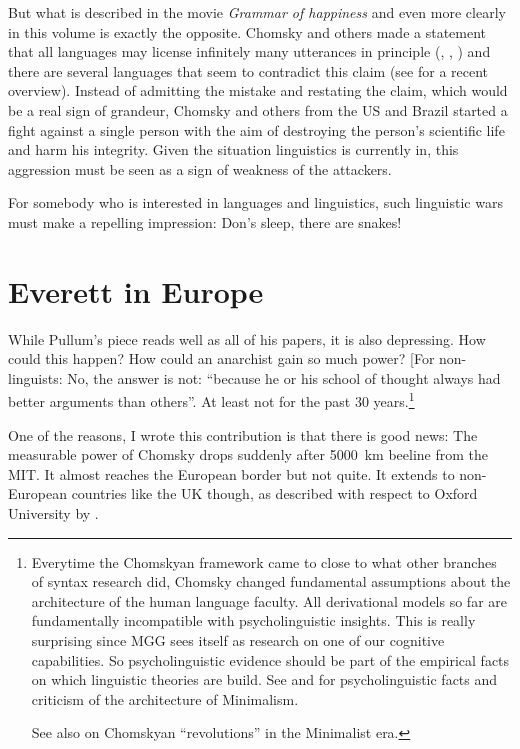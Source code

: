 \documentclass[output=paper,colorlinks,citecolor=brown]{langscibook}
\begin{document}
But what is described in the movie \emph{Grammar of happiness}  and even more clearly in  this volume is
exactly the opposite. Chomsky and others made a statement that all languages may license infinitely
many utterances in principle (\citealt*[]{HCF2002a}, \citealt[]{EH2005a-u}, \citealt*[]{HNG2005a}) and there are several languages that seem to contradict this claim (see
 for a recent overview). Instead of
admitting the mistake and restating the claim, which would be a real sign of grandeur, Chomsky and
others from the US and Brazil started a fight against a single person with the aim of destroying the
person's scientific life and harm his integrity. Given the situation linguistics is currently in,
this aggression must be seen as a sign of weakness of the attackers.

For somebody who is interested in languages and linguistics, such linguistic wars \citep{Harris93a} must make a
repelling impression: Don's sleep, there are snakes!    

\section{Everett in Europe}

While Pullum's piece reads well as all of his papers, it is also depressing. How could this happen?
How could an anarchist gain so much power? [For non-linguists: No, the answer is not: ``because he or
his school of thought always had better arguments than others''. At least not for the past 30
years.\footnote{
Everytime the Chomskyan framework came to close to what other branches of syntax research did,
Chomsky changed fundamental assumptions about the architecture of the human language faculty. All
derivational models so far are fundamentally incompatible with psycholinguistic insights. This is really
surprising since MGG sees itself as research on one of our cognitive capabilities. So
psycholinguistic evidence should be part of the empirical facts on which linguistic theories are
build. See  and \citet{BM2021a} for psycholinguistic facts and criticism of the
architecture of Minimalism.

See also  on Chomskyan ``revolutions'' in the Minimalist era.
}

One of the reasons, I wrote this contribution is that
there is good news: The measurable power of Chomsky drops suddenly after 5000~km beeline from the
MIT. It almost reaches the European border but not quite. It extends to non-European countries like
the UK though, as described with respect to Oxford University by \citet[Section~\ref{sec-Oxford-cancelation}]{Pullum2023a}. 
\end{document}
